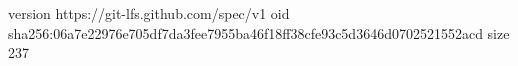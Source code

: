 version https://git-lfs.github.com/spec/v1
oid sha256:06a7e22976e705df7da3fee7955ba46f18ff38cfe93c5d3646d0702521552acd
size 237
